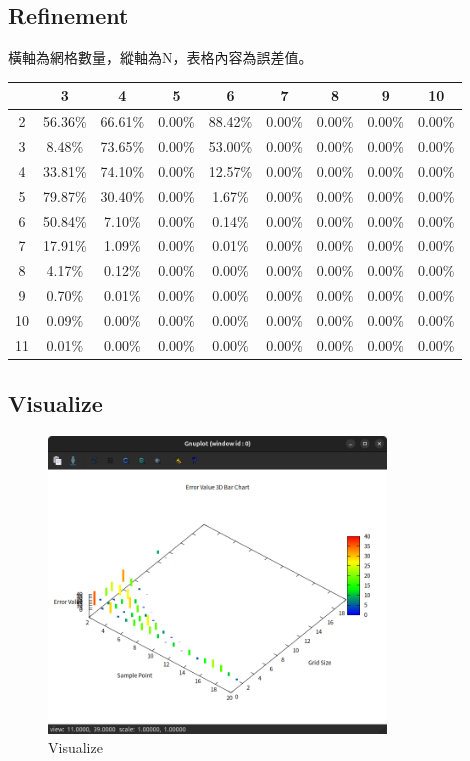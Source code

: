 \documentclass[a4paper,12pt]{article}
\begin{document}
\subsection{Refinement}
橫軸為網格數量，縱軸為N，表格內容為誤差值。
\begin{longtable}{|c|c|c|c|c|c|c|c|c|}
    \hline
    & 3 & 4 & 5 & 6 & 7 & 8 & 9 & 10\\
    \hline
    2 & 56.36\% & 66.61\% & 0.00\% & 88.42\% & 0.00\% & 0.00\% & 0.00\% & 0.00\%\\
    \hline
    3 & 8.48\% & 73.65\% & 0.00\% & 53.00\% & 0.00\% & 0.00\% & 0.00\% & 0.00\%\\
    \hline
    4 & 33.81\% & 74.10\% & 0.00\% & 12.57\% & 0.00\% & 0.00\% & 0.00\% & 0.00\%\\
    \hline
    5 & 79.87\% & 30.40\% & 0.00\% & 1.67\% & 0.00\% & 0.00\% & 0.00\% & 0.00\%\\
    \hline
    6 & 50.84\% & 7.10\% & 0.00\% & 0.14\% & 0.00\% & 0.00\% & 0.00\% & 0.00\%\\
    \hline
    7 & 17.91\% & 1.09\% & 0.00\% & 0.01\% & 0.00\% & 0.00\% & 0.00\% & 0.00\%\\
    \hline
    8 & 4.17\% & 0.12\% & 0.00\% & 0.00\% & 0.00\% & 0.00\% & 0.00\% & 0.00\%\\
    \hline
    9 & 0.70\% & 0.01\% & 0.00\% & 0.00\% & 0.00\% & 0.00\% & 0.00\% & 0.00\%\\
    \hline
    10 & 0.09\% & 0.00\% & 0.00\% & 0.00\% & 0.00\% & 0.00\% & 0.00\% & 0.00\%\\
    \hline
    11 & 0.01\% & 0.00\% & 0.00\% & 0.00\% & 0.00\% & 0.00\% & 0.00\% & 0.00\%\\
    \hline
\end{longtable}
\subsection{Visualize}
\begin{figure}[H]
    \centering
    \includegraphics[width=0.8\textwidth]{./img/plot.png}
    \caption{Visualize}
\end{figure}
\end{document}
